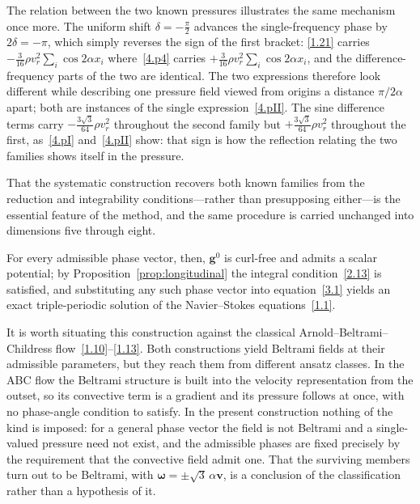 \documentclass[11pt]{jfm}
\numberwithin{equation}{section}
\begin{document}
The relation between the two known pressures illustrates the same mechanism once more. The
uniform shift $\delta=-\tfrac{\pi}{2}$ advances the single-frequency phase by
$2\delta=-\pi$, which simply reverses the sign of the first bracket: \eqref{1.21} carries
$-\tfrac{3}{16}\rho v_r^2\sum_i\cos2\alpha x_i$ where~\eqref{4.p4} carries
$+\tfrac{3}{16}\rho v_r^2\sum_i\cos2\alpha x_i$, and the difference-frequency parts of the two
are identical. The two expressions therefore look different while describing one pressure field
viewed from origins a distance $\pi/2\alpha$ apart; both are instances of the single
expression~\eqref{4.pII}. The sine difference terms carry
$-\tfrac{3\sqrt3}{64}\rho v_r^2$ throughout the second family but
$+\tfrac{3\sqrt3}{64}\rho v_r^2$ throughout the first, as~\eqref{4.pI}
and~\eqref{4.pII} show: that sign is how the reflection relating the two families shows itself in
the pressure.

That the systematic construction recovers both known families from the reduction and integrability
conditions---rather than presupposing either---is the essential feature of the method, and the same procedure
is carried unchanged into dimensions five through eight.

\medskip
For every admissible phase vector, then, $\boldsymbol{g}^0$ is curl-free and admits a scalar
potential; by Proposition~\ref{prop:longitudinal} the integral condition~\eqref{2.13} is
satisfied, and substituting any such phase vector into equation~\eqref{3.1} yields an exact
triple-periodic solution of the Navier--Stokes equations~\eqref{1.1}.

It is worth situating this construction against the classical Arnold--Beltrami--Childress
flow~\eqref{1.10}--\eqref{1.13}. Both constructions yield Beltrami fields at their admissible
parameters, but they reach them from different ansatz classes. In the ABC flow the Beltrami
structure is built into the velocity representation from the outset, so its convective term is a
gradient and its pressure follows at once, with no phase-angle condition to satisfy. In the present
construction nothing of the kind is imposed: for a general phase vector the field is not Beltrami
and a single-valued pressure need not exist, and the admissible phases are fixed precisely by the
requirement that the convective field admit one. That the surviving members turn out to be
Beltrami, with $\boldsymbol{\omega}=\pm\sqrt3\,\alpha\boldsymbol{v}$, is a conclusion of the
classification rather than a hypothesis of it.
\end{document}
